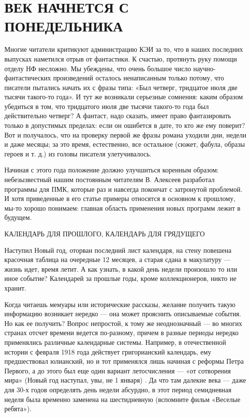 \documentclass[11pt,a4paper,oneside]{article}
\begin{document}
\section{ВЕК НАЧНЕТСЯ С ПОНЕДЕЛЬНИКА}
Многие читатели критикуют администрацию КЭИ за то, что в наших последних выпусках наметился отрыв от фантастики. К счастью, протянуть руку помощи отделу НФ несложно. Мы убеждены, что очень большое число научно- фантастических произведений осталось ненаписанным только потому, что писатели пытались начать их с фразы типа: «Был четверг, тридцатое июля две тысячи такого-то года». И тут же возникали серьезные сомнения: каким образом убедиться в том, что тридцатого июля две тысячи такого-то года был действительно четверг? А фантаст, надо сказать, имеет право фантазировать только в допустимых пределах: если он ошибется в дате, то кто же ему поверит? Вот и получалось, что на проверку первой же фразы романа уходили дни, недели и даже месяцы; за это время, естественно, все остальное (сюжет, фабула, образы героев и т. д.) из головы писателя улетучивалось.

Начиная с этого года положение должно улучшиться коренным образом: небезызвестный нашим постоянным читателям В. Алексеев разработал программы для ПМК, которые раз и навсегда покончат с затронутой проблемой. И хотя приведенные в его статье примеры относятся в основном к прошлому, мы-то хорошо понимаем: главная область применения новых программ лежит в будущем.

КАЛЕНДАРЬ ДЛЯ ПРОШЛОГО, КАЛЕНДАРЬ ДЛЯ ГРЯДУЩЕГО

Наступил Новый год, оторван последний лист календаря, на стену повешена красочная таблица на очередные 12 месяцев, а старая сдана в макулатуру — жизнь идет, время летит. А как узнать, в какой день недели произошло то или иное событие? Календарей за прошлые годы, кроме коллекционеров, никто не хранит.

Когда читаешь мемуары или исторические рассказы, желание получить такую информацию возникает нередко — она может прояснить описываемые события. Но как ее получить? Вопрос непростой, к тому же неоднозначный — во многих странах отсчет времени ведется по-разному, причем в разные периоды нередко применялись различные календарные системы. Например, в отечественной истории с февраля 1918 года действует григорианский календарь, ему предшествовал юлианский, но и тот применялся лишь начиная с реформы Петра Первого, а до этого был еще один вариант летосчисления — «от сотворения мира» (Новый год наступал, увы, не 1 января) . Да что там далекие века — даже для 30-х годов определять день недели абсурдно, в этот период семидневная неделя была временно заменена на шестидневную (вспомните фильм «Веселые ребята»).
\end{document}

